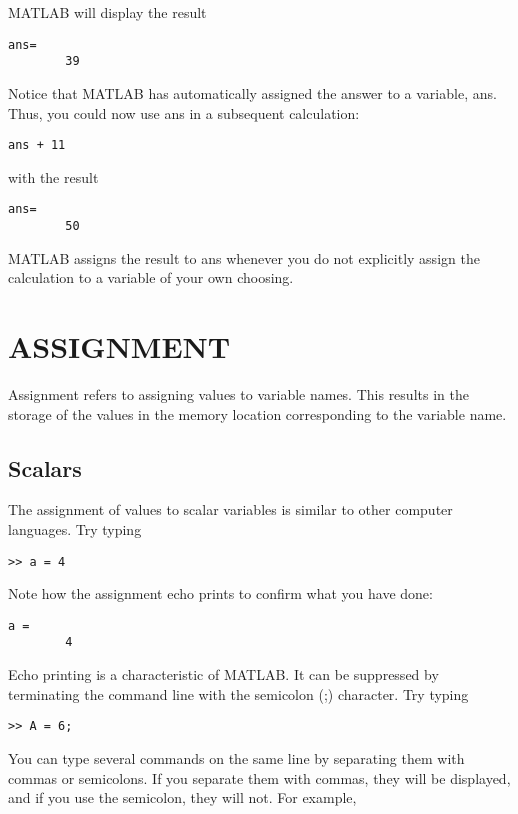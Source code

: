 \documentclass[../main.tex]{subfiles}
\begin{document}
MATLAB will display the result
	
\begin{lstlisting}[frame=none, numbers=none]
	ans=
		39
\end{lstlisting}

Notice that MATLAB has automatically assigned the answer to a variable, ans. Thus, you
could now use ans in a subsequent calculation:

\begin{lstlisting}[frame=none, numbers=none]
	ans + 11
\end{lstlisting}

with the result

\begin{lstlisting}[frame=none, numbers=none]
	ans=
		50
\end{lstlisting}

MATLAB assigns the result to ans whenever you do not explicitly assign the calculation
to a variable of your own choosing.

\section{ASSIGNMENT}

Assignment refers to assigning values to variable names. This results in the storage of the
values in the memory location corresponding to the variable name.

\subsection{Scalars}
The assignment of values to scalar variables is similar to other computer languages.
Try typing
\begin{lstlisting}[frame=none, numbers=none]
	>> a = 4
\end{lstlisting}

Note how the assignment echo prints to confirm what you have done:
\begin{lstlisting}[frame=none, numbers=none]
	a = 
		4
\end{lstlisting}

Echo printing is a characteristic of MATLAB. It can be suppressed by terminating the command line with the semicolon (;) character. Try typing
\begin{lstlisting}[frame=none, numbers=none]
	>> A = 6;
\end{lstlisting}

You can type several commands on the same line by separating them with commas or
semicolons. If you separate them with commas, they will be displayed, and if you use the
semicolon, they will not. For example,
\end{document}
